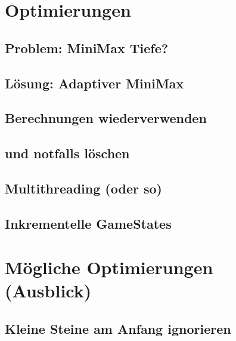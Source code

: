 \documentclass[12pt, draft]{beamer}
\begin{document}
\section{Optimierungen}
\subsection{Problem: MiniMax Tiefe?}
\begin{frame}
\end{frame}
\subsection{Lösung: Adaptiver MiniMax}
\begin{frame}
\end{frame}
\subsection{Berechnungen wiederverwenden}
\begin{frame}
\end{frame}
\subsection{und notfalls löschen}
\begin{frame}
\end{frame}
\subsection{Multithreading (oder so)}
\begin{frame}
\end{frame}
\subsection{Inkrementelle GameStates}
\begin{frame}
\end{frame}


\section{Mögliche Optimierungen (Ausblick)}
\subsection{Kleine Steine am Anfang ignorieren}
\begin{frame}
\end{frame}
\end{document}
